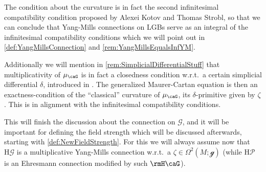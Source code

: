 \documentclass[reqno,a4paper,oneside]{amsart}
\newcommand\mutot{\mu_\caG}
\theoremstyle{plain}
\theoremstyle{remark}
\theoremstyle{definition}
\begin{document}
The condition about the curvature is in fact the second infinitesimal compatibility condition proposed by Alexei Kotov and Thomas Strobl, so that we can conclude that Yang-Mills connections on LGBs serve as an integral of the infinitesimal compatibility conditions which we will point out in \ref{def:YangMillsConnection} and \ref{rem:YangMillsEqualsInfYM}.
%

Additionally we will mention in \ref{rem:SimplicialDifferentialStuff} that multiplicativity of $\mutot$ is in fact a closedness condition w.r.t.\ a certain simplicial differential $\delta$, introduced in \cite[beginning of \S 1.2]{crainic2003differentiable}. The generalized Maurer-Cartan equation is then an exactness-condition of the ``classical'' curvature of $\mutot$, its $\delta$-primitive given by $\zeta$. This is in alignment with the infinitesimal compatibility conditions.

This will finish the discussion about the connection on $\mathcal{G}$, and it will be important for defining the field strength which will be discussed afterwards, starting with \ref{def:NewFieldStrength}. For this we will always assume now that $\mathrm{H}\mathcal{G}$ is a multiplicative Yang-Mills connection w.r.t.\ a $\zeta \in \Omega^2(M; \mathcal{g})$ (while $\mathrm{H}\mathcal{P}$ is an Ehresmann connection modified by such $\rmH\caG$).
\end{document}
